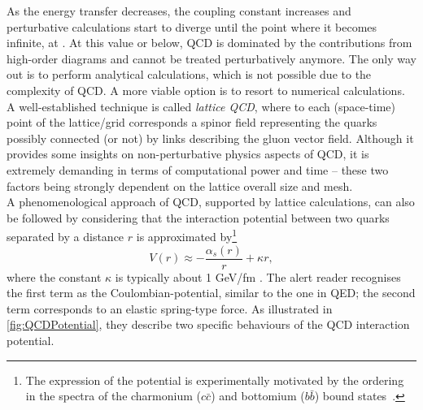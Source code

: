 As the energy transfer decreases, the coupling constant increases and perturbative calculations start to diverge until the point where it becomes infinite, at \LambdaQCD. At this value or below, QCD is dominated by the contributions from high-order diagrams and cannot be treated perturbatively anymore. The only way out is to perform analytical calculations, which is not possible due to the complexity of QCD. A more viable option is to resort to numerical calculations. A well-established technique is called \textit{lattice QCD}, where to each (space-time) point of the \mbox{lattice/grid} corresponds a spinor field representing the quarks possibly connected (or not) by links describing the gluon vector field. Although it provides some insights on non-perturbative physics aspects of QCD, it is extremely demanding in terms of computational power and time -- these two factors being strongly dependent on the lattice overall size and mesh.\\

A phenomenological approach of QCD, supported by lattice calculations, can also be followed by considering that the interaction potential between two quarks separated by a distance $r$ is approximated by\footnote{The expression of the potential is experimentally motivated by the ordering in the spectra of the charmonium ($c\bar{c}$) and bottomium ($b\bar{b}$) bound states~\cite{martinParticlePhysics2017, thomsonModernParticlePhysics2013}.}
\begin{equation}
V(r) \approx - \frac{\alpha_{s}(r)}{r} + \kappa r,
\label{eq:QCDPotential}
\end{equation}
where the constant $\kappa$ is typically about 1 GeV/fm \cite{martinParticlePhysics2017}. The alert reader recognises the first term as the Coulombian-potential, similar to the one in QED; the second term corresponds to an elastic spring-type force. As illustrated in \fig\ref{fig:QCDPotential}, they describe two specific behaviours of the QCD interaction potential.

